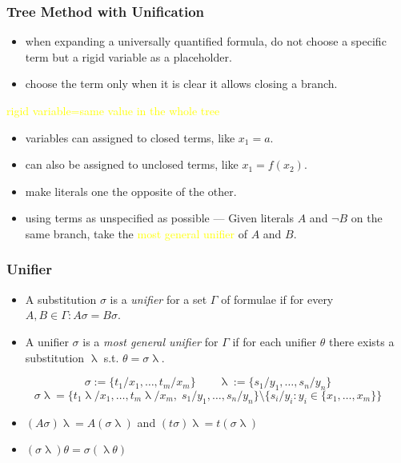 \documentclass[UTF8,aspectratio=43,11pt,colorlinks,compress,openany]{beamer}%
\begin{document}
\begin{frame}\frametitle{Tree Method with Unification}
	\begin{itemize}
		\item when expanding a universally quantified formula, do not choose a specific term but a rigid variable as a placeholder.
		\item choose the term only when it is clear it allows closing a branch.
	\end{itemize}
	\begin{center}
		\textcolor{yellow}{rigid variable=same value in the whole tree}
	\end{center}
	\begin{itemize}
		\item variables can assigned to closed terms, like $x_1=a$.
		\item can also be assigned to unclosed terms, like $x_1=f(x_2)$.
	\end{itemize}
	\begin{itemize}
		\item make literals one the opposite of the other.
		\item using terms as unspecified as possible --- Given literals $A$ and $\neg B$ on the same branch, take the \textcolor{yellow}{most general unifier} of $A$ and $B$.
	\end{itemize}
\end{frame}

\begin{frame}\frametitle{Unifier}
\begin{block}{}
\begin{itemize}
\item A substitution $\sigma$ is a \emph{unifier} for a set $\Gamma$ of formulae if for every $A, B\in\Gamma: A\sigma=B\sigma$.
\item A unifier $\sigma$ is a \emph{most general unifier} for $\Gamma$ if for each unifier $\theta$ there exists a substitution $\uplambda$ s.t. $\theta=\sigma\uplambda$.
\end{itemize}
\end{block}
\[\sigma:=\{t_1/x_1,\dots,t_m/x_m\}\qquad \uplambda:=\{s_1/y_1,\dots,s_n/y_n\}\]
\[\sigma\uplambda=\big\{t_1\uplambda/x_1,\dots,t_m\uplambda/x_m,\; s_1/y_1,\dots,s_n/y_n\big\}\setminus\big\{s_i/y_i: y_i\in\{x_1,\dots,x_m\}\big\}\]
\begin{itemize}
	\item $(A\sigma)\uplambda=A(\sigma\uplambda)$ and $(t\sigma)\uplambda=t(\sigma\uplambda)$
	\item $(\sigma\uplambda)\theta=\sigma(\uplambda\theta)$
\end{itemize}
\end{frame}
\end{document}
